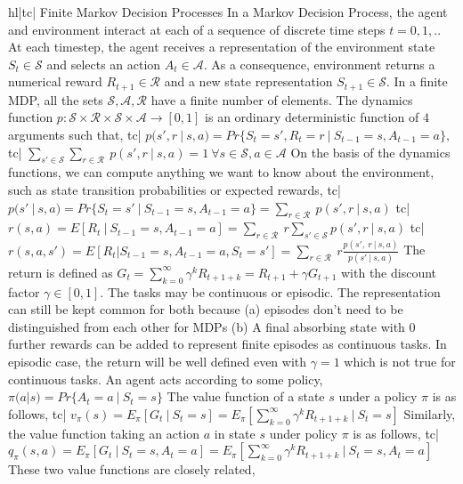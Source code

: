 hl|tc| Finite Markov Decision Processes
In a Markov Decision Process, the agent and environment interact at each of a sequence of discrete time steps \( t=0,1,.. \)
At each timestep, the agent receives a representation of the environment state \( S_t \in \mathcal{S} \) and selects an action \( A_t \in \mathcal{A} \). As a consequence, environment returns a numerical reward \( R_{t+1} \in \mathcal{R} \) and a new state representation \( S_{t+1} \in \mathcal{S} \).
In a finite MDP, all the sets \( \mathcal{S, A, R} \) have a finite number of elements.
The dynamics function \( p: \mathcal{S \times R \times S \times A} \rightarrow [0,1] \) is an ordinary deterministic function of \( 4 \) arguments such that,
tc| \( p(s', r \ | \ s, a) = Pr\{S_t = s', R_t = r \ | \ S_{t-1} = s, A_{t - 1} = a \}, \)
tc| \( \sum_{s' \in \mathcal{S}} \sum_{r \in \mathcal{R}} \ p(s', r \ | \ s, a) = 1 \ \forall s \in \mathcal{S}, a \in \mathcal{A} \)
On the basis of the dynamics functions, we can compute anything we want to know about the environment, such as state transition probabilities or expected rewards,
tc| \( p(s' \ | \ s, a) =Pr\{ S_t = s' \ | \ S_{t-1} = s, A_{t-1} = a \} = \sum_{r \in \mathcal{R}} \ p(s', r \ | \ s, a) \)
tc| \( r(s, a) = E[R_t \ | \ S_{t-1} = s, A_{t-1} = a] = \sum_{r \in \mathcal{R}} \ r \sum_{s' \in \mathcal{S}} p(s', r \ | \ s,a) \)
tc| \( r(s, a, s') = E[R_t | S_{t-1} = s, A_{t-1} = a, S_t = s'] = \sum_{r \in \mathcal{R}} \ r \frac{p(s', \ r \ | \ s, a)}{p(s' \ | \ s, a)} \)
The return is defined as \( G_t = \sum_{k=0}^\infty \gamma^k R_{t + 1 + k} = R_{t+1} + \gamma G_{t+1} \) with the discount factor \( \gamma \in [0,1] \).
The tasks may be continuous or episodic. The representation can still be kept common for both because (a) episodes don't need to be distinguished from each other for MDPs (b) A final absorbing state with 0 further rewards can be added to represent finite episodes as continuous tasks. In episodic case, the return will be well defined even with \( \gamma = 1 \) which is not true for continuous tasks.
An agent acts according to some policy, \( \pi(a|s) = Pr \{ A_t = a \ | \ S_t = s \} \)
The value function of a state \( s \) under a policy \( \pi \) is as follows,
tc| \( v_\pi(s) = E_\pi[ G_t \ | \ S_t = s ] = E_\pi[ \sum_{k=0}^\infty \gamma^k R_{t + 1 + k} \ | \ S_t = s] \)
Similarly, the value function taking an action \( a \) in state \( s \) under policy \( \pi \) is as follows,
tc| \( q_\pi(s, a) = E_\pi[G_{t} \ | \ S_t = s, A_t = a ] = E_\pi[ \sum_{k=0}^\infty \gamma^k R_{t+1+k} \ | \ S_t = s, A_t = a ] \)
These two value functions are closely related,
